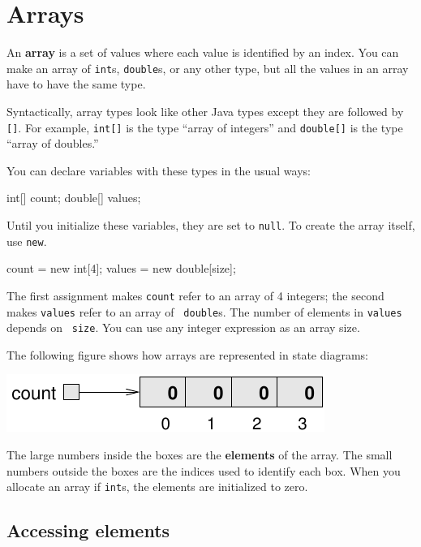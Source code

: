 \chapter{Arrays}
\label{chap10}
\label{arrays}

An {\bf array} is a set of values where each value is identified by an
index.  You can make an array of {\tt int}s, {\tt double}s, or any
other type, but all the values in an array have to have the same type.

Syntactically, array types look like other Java types except they are
followed by {\tt []}.  For example, {\tt int[]} is the type ``array of
integers'' and {\tt double[]} is the type ``array of doubles.''

You can declare variables with these types in the usual ways:

\begin{code}
    int[] count;
    double[] values;
\end{code}
%
Until you initialize these variables, they are set to {\tt null}.
To create the array itself, use {\tt new}.

\begin{code}
    count = new int[4];
    values = new double[size];
\end{code}
%
The first assignment makes {\tt count} refer to an array of 4
integers; the second makes {\tt values} refer to an array of {\tt
double}s.  The number of elements in {\tt values} depends on {\tt
size}.  You can use any integer expression as an array
size.


The following figure shows how arrays are represented in state
diagrams:


\includegraphics{figs/array.pdf}


The large numbers inside the boxes are the {\bf elements} of
the array.  The small numbers outside the boxes are the
indices used to identify each box.  When you allocate an
array if {\tt int}s, the elements are initialized to zero.


\section{Accessing elements}

